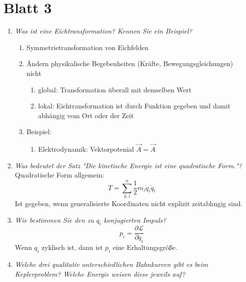 \newpage

\section*{Blatt 3}

\begin{enumerate}
    \item \textit{Was ist eine Eichtransformation? Kennen Sie ein Beispiel?} \\
        \begin{enumerate}
            \item Symmetrietransformation von Eichfelden
            \item Ändern physikalische Begebenheiten (Kräfte, Bewegungsgleichungen) nicht
                \begin{enumerate}
                    \item global: Transformation überall mit demselben Wert
                    \item lokal: Eichtransformation ist durch Funktion gegeben und damit abhängig vom Ort oder der Zeit
                \end{enumerate}
            \item Beispiel:
                \begin{enumerate}
                    \item Elektrodynamik: Vektorpotenial $\vec{A}=\vec{A}$
                \end{enumerate}
        \end{enumerate}
    \item \textit{Was bedeutet der Satz "Die kinetische Energie ist eine quadratische Form."?} \\
        Quadratische Form allgemein:
        \begin{equation}
            T=\sum^n_{k,l} \frac{1}{2} m_i \dot{q}_i \dot{q}_l
        \end{equation}
        Ist gegeben, wenn generalisierte Koordinaten nicht explizit zeitabhngig sind. 
    \item \textit{Wie bestimmen Sie den zu $q_i$ konjugierten Impuls?} \\
        \begin{equation}
            p_i= \frac{\partial \mathcal{L}}{\partial \dot{q}_i}
        \end{equation}
        Wenn $q_i$ zyklisch ist, dann ist $p_i$ eine Erhaltungsgröße.
    \item \textit{Welche drei qualitativ unterschiedlichen Bahnkurven gibt es beim Keplerproblem? Welche Energie weisen diese jeweils auf?} \\

\end{enumerate}
